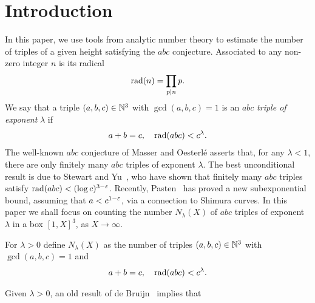 %

\chapter{Introduction}

In this paper, we use tools from analytic number theory to estimate the number of triples of a given height satisfying the $abc$ conjecture.
Associated to any non-zero integer $n$ is its radical
\begin{align*}
\operatorname{rad}(n)=\prod_{p\mid n}p.
\end{align*}
We say that a triple $(a,b,c)\in \mathbb{N}^3$
with $\gcd(a,b,c)=1$ is
 an $abc$ \emph{triple of exponent} $\lambda$ if
\begin{align*}
a+b=c,\quad \operatorname{rad}(abc) < c^{\lambda}.
\end{align*}
The well-known $abc$ conjecture of Masser and Oesterl\'e asserts that, for any $\lambda<1$, there are only finitely many $abc$ triples of exponent $\lambda$.
The best unconditional result is due to Stewart and Yu~\cite{styu}, who have shown that finitely many $abc$ triples satisfy $\operatorname{rad}(abc) < (\log c)^{3-\varepsilon}$. Recently, Pasten~\cite{hector} has proved a new subexponential bound, assuming that $a<c^{1-\varepsilon}$, via a connection to Shimura curves.
In this paper we shall focus on counting the number $N_\lambda(X)$ of $abc$ triples of exponent $\lambda$ in a box $[1,X]^3$, as $X\to \infty$.

\begin{definition}\label{def:Nlambda}
For $\lambda>0$ define $N_\lambda(X)$ as the number of triples $(a,b,c)\in \mathbb{N}^3$ with $\gcd(a,b,c)=1$ and
\begin{align*}
  a+b=c,\quad \operatorname{rad}(abc) < c^{\lambda}.
  \end{align*}
\end{definition}

Given $\lambda>0$,
an old result of
de Bruijn~\cite{debruijn} implies that

